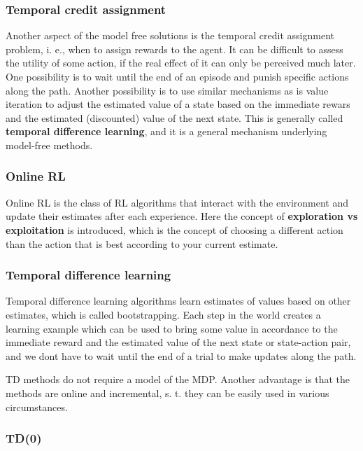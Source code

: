 \subsubsection{Temporal credit assignment}

Another aspect of the model free solutions is the temporal credit assignment problem, i. e., when to assign rewards to the agent. It can be difficult to assess the utility of some action, if the real effect of it can only be perceived much later. One possibility is to wait until the end of an episode and punish specific actions along the path. Another possibility is to use similar mechanisms as is value iteration to adjust the estimated value of a state based on the immediate rewars and the estimated (discounted) value of the next state. This is generally called \textbf{temporal difference learning}, and it is a general mechanism underlying model-free methods.


\subsubsection{Online RL}

Online RL is the class of RL algorithms that interact with the environment and update their estimates after each experience. Here the concept of \textbf{exploration vs exploitation} is introduced, which is the concept of choosing a different action than the action that is best according to your current estimate.

\subsubsection{Temporal difference learning}

Temporal difference learning algorithms learn estimates of values based on other estimates, which is called bootstrapping. Each step in the world creates a learning example which can be used to bring some value in accordance to the immediate reward and the estimated value of the next state or state-action pair, and we dont have to wait until the end of a trial to make updates along the path.

TD methods do not require a model of the MDP. Another advantage is that the methods are online and incremental, s. t. they can be easily used in various circumstances.

\subsubsection{TD(0)}

